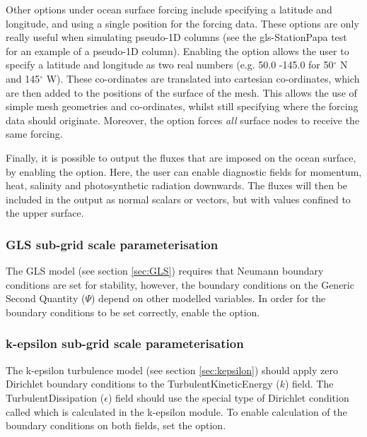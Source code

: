 Other options under ocean surface forcing include specifying a latitude and longitude, and using a single position for the
forcing data. These options are only really useful when simulating pseudo-1D columns (see the gls-StationPapa test for an example
of a pseudo-1D column). Enabling the  option allows the user to specify a latitude and longitude as
two real numbers (e.g. 50.0 -145.0 for 50$^\circ$ N and 145$^\circ$ W). These co-ordinates are translated into cartesian
co-ordinates, which are then added to the positions of the surface of the mesh. This allows the use of simple mesh geometries
and co-ordinates, whilst still specifying where the forcing data should originate. Moreover, the 
option forces \emph{all} surface nodes to receive the same forcing.

Finally, it is possible to output the fluxes that are imposed on the ocean surface, by enabling the
 option. Here, the user can enable diagnostic fields for momentum, heat, salinity and
photosynthetic radiation downwards. The fluxes will then be included in the output as normal scalars or vectors, but with values
confined to the upper surface.

\subsubsection{GLS sub-grid scale parameterisation}\label{sec:BCs:special:gls}

The GLS model (see section \ref{sec:GLS}) requires that Neumann boundary
conditions are set for stability, however, the boundary conditions on the
Generic Second Quantity ($\Psi$) depend on other modelled variables. In
order for the boundary conditions to be set correctly, enable the \linebreak
{}
option.

\subsubsection{k-epsilon sub-grid scale parameterisation}\label{sec:BCs:special:kepsilon}

The k-epsilon turbulence model (see section \ref{sec:kepsilon}) should apply zero Dirichlet boundary
conditions to the TurbulentKineticEnergy ($k$) field. The TurbulentDissipation ($\epsilon$) field
should use the special type of Dirichlet condition called  which is calculated in the
k-epsilon module. To enable calculation of the boundary conditions on both fields, set the \linebreak
{}
option.

